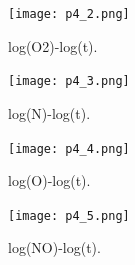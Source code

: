 \documentclass[letterpaper,10pt]{article}
\begin{document}
\begin{figure}[h]
  \centering
  \texttt{[image: p4\_2.png]}
  \caption{log(O2)-log(t). }
  \label{fig4_2}
\end{figure}

\begin{figure}[h]
  \centering
  \texttt{[image: p4\_3.png]}
  \caption{log(N)-log(t). }
  \label{fig4_3}
\end{figure}

\begin{figure}[h]
  \centering
  \texttt{[image: p4\_4.png]}
  \caption{log(O)-log(t). }
  \label{fig4_4}
\end{figure}

\begin{figure}[h]
  \centering
  \texttt{[image: p4\_5.png]}
  \caption{log(NO)-log(t). }
  \label{fig4_5}
\end{figure}
\end{document}
